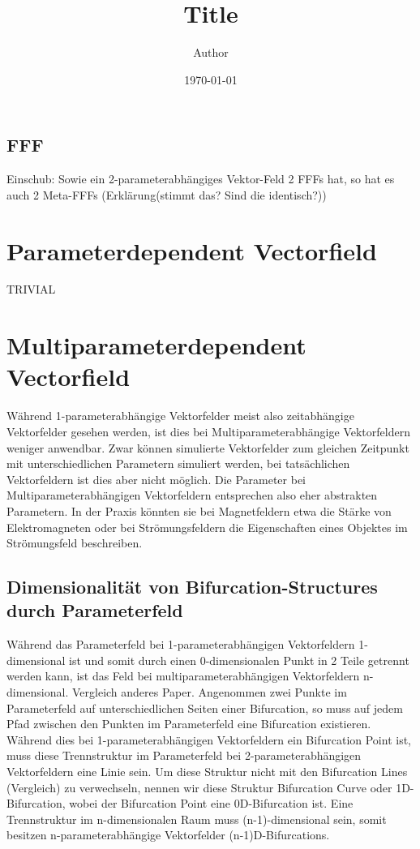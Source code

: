 \documentclass[11pt]{article}
\title{ Title}
\author{ Author }
\date{\today}
\begin{document}
\maketitle	
\pagebreak

\subsection{FFF}
Einschub:
Sowie ein 2-parameterabhängiges Vektor-Feld 2 FFFs hat, so hat es auch 2 Meta-FFFs (Erklärung(stimmt das? Sind die identisch?))


\section{Parameterdependent Vectorfield}
TRIVIAL

\section{Multiparameterdependent Vectorfield}
Während 1-parameterabhängige Vektorfelder meist also zeitabhängige Vektorfelder gesehen werden, ist dies bei Multiparameterabhängige Vektorfeldern weniger anwendbar. Zwar können simulierte Vektorfelder zum gleichen Zeitpunkt mit unterschiedlichen Parametern simuliert werden, bei tatsächlichen Vektorfeldern ist dies aber nicht möglich. Die Parameter bei Multiparameterabhängigen Vektorfeldern entsprechen also eher abstrakten Parametern. In der Praxis könnten sie bei Magnetfeldern etwa die Stärke von Elektromagneten oder bei Strömungsfeldern die Eigenschaften eines Objektes im Strömungsfeld beschreiben.

\subsection{Dimensionalität von Bifurcation-Structures durch Parameterfeld}
Während das Parameterfeld bei 1-parameterabhängigen Vektorfeldern 1-dimensional ist und somit durch einen 0-dimensionalen Punkt in 2 Teile getrennt werden kann, ist das Feld bei multiparameterabhängigen Vektorfeldern n-dimensional.
Vergleich anderes Paper.
Angenommen zwei Punkte im Parameterfeld auf unterschiedlichen Seiten einer Bifurcation, so muss auf jedem Pfad zwischen den Punkten im Parameterfeld eine Bifurcation existieren. Während dies bei 1-parameterabhängigen Vektorfeldern ein Bifurcation Point ist, muss diese Trennstruktur im Parameterfeld bei 2-parameterabhängigen Vektorfeldern eine Linie sein. Um diese Struktur nicht mit den Bifurcation Lines (Vergleich) zu verwechseln, nennen wir diese Struktur Bifurcation Curve oder 1D-Bifurcation, wobei der Bifurcation Point eine 0D-Bifurcation ist.
Eine Trennstruktur im n-dimensionalen Raum muss (n-1)-dimensional sein, somit besitzen n-parameterabhängige Vektorfelder (n-1)D-Bifurcations.
\end{document}
